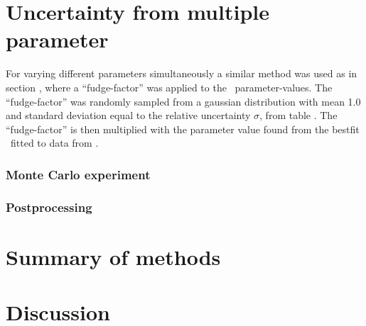 \section{Uncertainty from multiple parameter}
For varying different parameters simultaneously a similar method was used as in section , where a ``fudge-factor'' was applied to the \fiduccialomega\ parameter-values. The ``fudge-factor'' was randomly sampled from a gaussian distribution with mean 1.0 and standard deviation equal to the relative uncertainty $\sigma$, from table .
The ``fudge-factor'' is then multiplied with the parameter value found from the bestfit \fiduccialomega\ fitted to data from \eris.


\subsubsection{Monte Carlo experiment}

\subsubsection{Postprocessing}

\FloatBarrier

\section{Summary of methods}
\section{Discussion}

